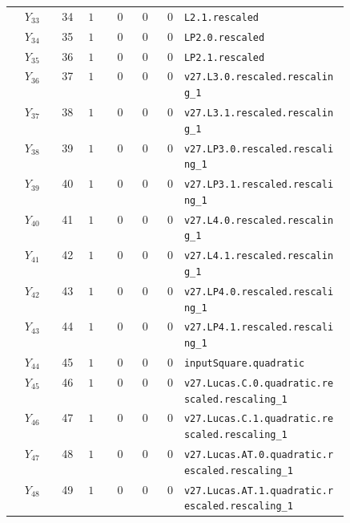 {\begin{longtable}{@{}r r c r r r p{0.49\linewidth}@{}}
\(Y_{33}\) & 34 & \(1\) & 0 & 0 & 0 & \texttt{L2.\allowbreak{}1.\allowbreak{}rescaled} \\
\(Y_{34}\) & 35 & \(1\) & 0 & 0 & 0 & \texttt{LP2.\allowbreak{}0.\allowbreak{}rescaled} \\
\(Y_{35}\) & 36 & \(1\) & 0 & 0 & 0 & \texttt{LP2.\allowbreak{}1.\allowbreak{}rescaled} \\
\(Y_{36}\) & 37 & \(1\) & 0 & 0 & 0 & \texttt{v27.\allowbreak{}L3.\allowbreak{}0.\allowbreak{}rescaled.\allowbreak{}rescaling\_1} \\
\(Y_{37}\) & 38 & \(1\) & 0 & 0 & 0 & \texttt{v27.\allowbreak{}L3.\allowbreak{}1.\allowbreak{}rescaled.\allowbreak{}rescaling\_1} \\
\(Y_{38}\) & 39 & \(1\) & 0 & 0 & 0 & \texttt{v27.\allowbreak{}LP3.\allowbreak{}0.\allowbreak{}rescaled.\allowbreak{}rescaling\_1} \\
\(Y_{39}\) & 40 & \(1\) & 0 & 0 & 0 & \texttt{v27.\allowbreak{}LP3.\allowbreak{}1.\allowbreak{}rescaled.\allowbreak{}rescaling\_1} \\
\(Y_{40}\) & 41 & \(1\) & 0 & 0 & 0 & \texttt{v27.\allowbreak{}L4.\allowbreak{}0.\allowbreak{}rescaled.\allowbreak{}rescaling\_1} \\
\(Y_{41}\) & 42 & \(1\) & 0 & 0 & 0 & \texttt{v27.\allowbreak{}L4.\allowbreak{}1.\allowbreak{}rescaled.\allowbreak{}rescaling\_1} \\
\(Y_{42}\) & 43 & \(1\) & 0 & 0 & 0 & \texttt{v27.\allowbreak{}LP4.\allowbreak{}0.\allowbreak{}rescaled.\allowbreak{}rescaling\_1} \\
\(Y_{43}\) & 44 & \(1\) & 0 & 0 & 0 & \texttt{v27.\allowbreak{}LP4.\allowbreak{}1.\allowbreak{}rescaled.\allowbreak{}rescaling\_1} \\
\(Y_{44}\) & 45 & \(1\) & 0 & 0 & 0 & \texttt{inputSquare.\allowbreak{}quadratic} \\
\(Y_{45}\) & 46 & \(1\) & 0 & 0 & 0 & \texttt{v27.\allowbreak{}Lucas.\allowbreak{}C.\allowbreak{}0.\allowbreak{}quadratic.\allowbreak{}rescaled.\allowbreak{}rescaling\_1} \\
\(Y_{46}\) & 47 & \(1\) & 0 & 0 & 0 & \texttt{v27.\allowbreak{}Lucas.\allowbreak{}C.\allowbreak{}1.\allowbreak{}quadratic.\allowbreak{}rescaled.\allowbreak{}rescaling\_1} \\
\(Y_{47}\) & 48 & \(1\) & 0 & 0 & 0 & \texttt{v27.\allowbreak{}Lucas.\allowbreak{}AT.\allowbreak{}0.\allowbreak{}quadratic.\allowbreak{}rescaled.\allowbreak{}rescaling\_1} \\
\(Y_{48}\) & 49 & \(1\) & 0 & 0 & 0 & \texttt{v27.\allowbreak{}Lucas.\allowbreak{}AT.\allowbreak{}1.\allowbreak{}quadratic.\allowbreak{}rescaled.\allowbreak{}rescaling\_1} \\

\end{longtable}}
